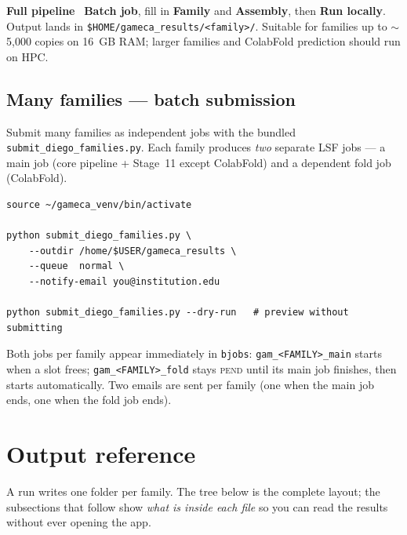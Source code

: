 \documentclass[11pt]{article}
\begin{document}
\textbf{Full pipeline} \textrightarrow\ \textbf{Batch job}, fill in
\textbf{Family} and \textbf{Assembly}, then \textbf{Run locally}. Output
lands in \texttt{\$HOME/gameca\_results/<family>/}. Suitable for families
up to $\sim$5{,}000 copies on 16~GB RAM; larger families and ColabFold
prediction should run on HPC.

\subsection{Many families --- batch submission}

Submit many families as independent jobs with the bundled
\texttt{submit\_diego\_families.py}. Each family produces \emph{two}
separate LSF jobs --- a main job (core pipeline + Stage~11 except
ColabFold) and a dependent fold job (ColabFold).

\begin{lstlisting}
source ~/gameca_venv/bin/activate

python submit_diego_families.py \
    --outdir /home/$USER/gameca_results \
    --queue  normal \
    --notify-email you@institution.edu

python submit_diego_families.py --dry-run   # preview without submitting
\end{lstlisting}

Both jobs per family appear immediately in \texttt{bjobs}:
\texttt{gam\_<FAMILY>\_main} starts when a slot frees;
\texttt{gam\_<FAMILY>\_fold} stays \textsc{pend} until its main job
finishes, then starts automatically. Two emails are sent per family
(one when the main job ends, one when the fold job ends).

\section{Output reference}

A run writes one folder per family. The tree below is the complete
layout; the subsections that follow show \emph{what is inside each file}
so you can read the results without ever opening the app.
\end{document}
